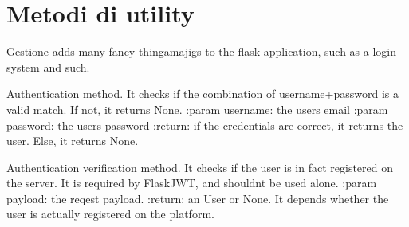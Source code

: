 \documentclass[letterpaper,10pt,italian]{sphinxmanual}
\begin{document}
\section{ \sphinxhyphen{} Metodi di utility}
\label{\detokenize{code/backend/index:module-nest_backend.gestione}}\label{\detokenize{code/backend/index:gestione-metodi-di-utility}}
\sphinxAtStartPar
Gestione adds many fancy thingamajigs to the flask application, such as a login system and such.

\begin{fulllineitems}
\label{\detokenize{code/backend/index:nest_backend.gestione.authenticate}}
\sphinxAtStartPar
Authentication method. It checks if the combination of username+password is a valid match. If not, it returns None.
:param username: the user\textquotesingle{}s email
:param password: the user\textquotesingle{}s password
:return: if the credentials are correct, it returns the user. Else, it returns None.

\end{fulllineitems}


\begin{fulllineitems}
\label{\detokenize{code/backend/index:nest_backend.gestione.identity}}
\sphinxAtStartPar
Authentication verification method. It checks if the user is in fact registered on the server.
It is required by Flask\sphinxhyphen{}JWT, and shouldnt be used alone.
:param payload: the reqest payload.
:return: an User or None. It depends whether the user is actually registered on the platform.

\end{fulllineitems}

\end{document}
